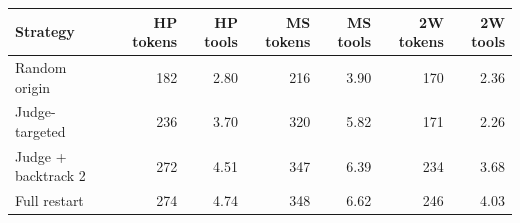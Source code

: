 \begin{tabular}{@{}lrrrrrr@{}}
\toprule
Strategy & HP tokens & HP tools & MS tokens & MS tools & 2W tokens & 2W tools \\
\midrule
Random origin & 182 & 2.80 & 216 & 3.90 & 170 & 2.36 \\
Judge-targeted & 236 & 3.70 & 320 & 5.82 & 171 & 2.26 \\
Judge + backtrack 2 & 272 & 4.51 & 347 & 6.39 & 234 & 3.68 \\
Full restart & 274 & 4.74 & 348 & 6.62 & 246 & 4.03 \\
\bottomrule
\end{tabular}
